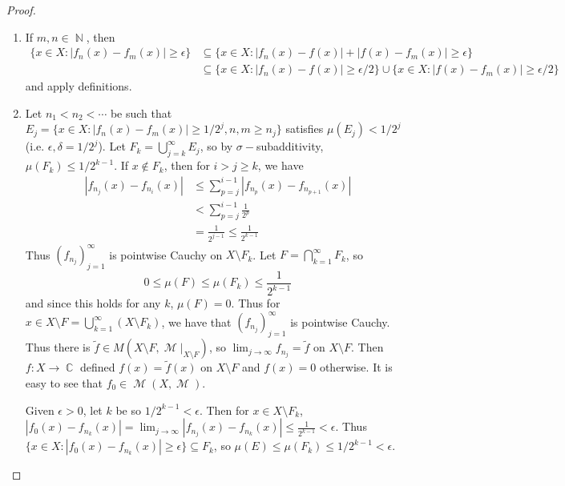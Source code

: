 \documentclass[12pt, a4paper]{memoir}
\DeclareMathOperator{\N}{{\mathbb{N}}}
\DeclareMathOperator{\C}{{\mathbb{C}}}
\theoremstyle{nonumberplain}
\newtheorem{proof}{Proof}
\DeclareMathOperator{\M}{\mathcal{M}}
\begin{document}
\begin{proof}
    \begin{enumerate}[nolistsep,label=(\roman*)]
        \item If $m,n\in\N$, then
            \begin{align*}
                \{x\in X:|f_n(x)-f_m(x)|\geq\epsilon\}&\subseteq\{x\in X:|f_n(x)-f(x)|+|f(x)-f_m(x)|\geq\epsilon\}\\
                                                      &\subseteq\{x\in X:|f_n(x)-f(x)|\geq\epsilon/2\}\cup\{x\in X:|f(x)-f_m(x)|\geq\epsilon/2\}
            \end{align*}
            and apply definitions.
        \item Let $n_1<n_2<\cdots$ be such that $E_j=\{x\in X:|f_n(x)-f_m(x)|\geq 1/2^j,n,m\geq n_j\}$ satisfies $\mu(E_j)<1/2^j$ (i.e. $\epsilon,\delta=1/2^j$).
            Let $F_k=\bigcup_{j=k}^\infty E_j$, so by $\sigma-$subadditivity, $\mu(F_k)\leq 1/2^{k-1}$.
            If $x\notin F_k$, then for $i>j\geq k$, we have
            \begin{align*}
                |f_{n_j}(x)-f_{n_i}(x)| &\leq\sum\limits_{p=j}^{i-1}|f_{n_p}(x)-f_{n_{p+1}}(x)|\\
                                        &< \sum\limits_{p=j}^{i-1}\frac{1}{2^p}\\
                                        &= \frac{1}{2^{j-1}}\leq\frac{1}{2^{k-1}}
            \end{align*}
            Thus $(f_{n_j})_{j=1}^\infty$ is pointwise Cauchy on $X\setminus F_k$.
            Let $F=\bigcap_{k=1}^\infty F_k$, so
            \begin{equation*}
                0\leq \mu(F)\leq\mu(F_k)\leq\frac{1}{2^{k-1}}
            \end{equation*}
            and since this holds for any $k$, $\mu(F)=0$.
            Thus for $x\in X\setminus F=\bigcup_{k=1}^\infty(X\setminus F_k)$, we have that $(f_{n_j})_{j=1}^\infty$ is pointwise Cauchy.
            Thus there is $\tilde f\in M(X\setminus F,\M|_{X\setminus F})$, so $\lim_{j\to\infty}f_{n_j}=\tilde f$ on $X\setminus F$.
            Then $f:X\to\C$ defined $f(x)=\tilde f(x)$ on $X\setminus F$ and $f(x)=0$ otherwise.
            It is easy to see that $f_0\in \M(X,\M)$.

            Given $\epsilon>0$, let $k$ be so $1/2^{k-1}<\epsilon$.
            Then for $x\in X\setminus F_k$, $|f_0(x)-f_{n_k}(x)|=\lim_{j\to\infty}|f_{n_j}(x)-f_{n_k}(x)|\leq\frac{1}{2^{k-1}}<\epsilon$.
            Thus $\{x\in X:|f_0(x)-f_{n_k}(x)|\geq\epsilon\}\subseteq F_k$, so $\mu(E)\leq\mu(F_k)\leq1/2^{k-1}<\epsilon$.
    \end{enumerate}
\end{proof}
\end{document}
